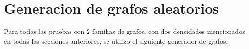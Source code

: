 \section{Generacion de grafos aleatorios}
Para todas las pruebas con 2 familias de grafos, con dos densidades mencionados en todas las secciones anteriores, se utilizo el siguiente generador de grafos: